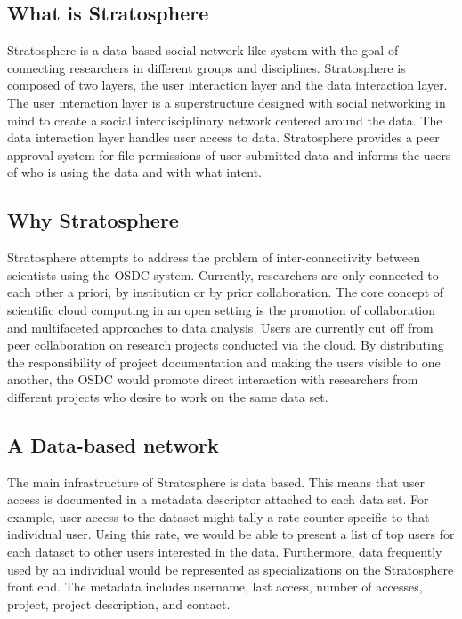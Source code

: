 \tableofcontents
\newpage
\begin{multicols*}{2}
\section{What is Stratosphere}

Stratosphere is a data-based social-network-like system with the goal
of connecting researchers in different groups and disciplines.
Stratosphere is composed of two layers, the user interaction layer and
the data interaction layer.  The user interaction layer is a
superstructure designed with social networking in mind to create a
social interdisciplinary network centered around the data.  The data
interaction layer handles user access to data. Stratosphere provides a
peer approval system for file permissions of user submitted data and
informs the users of who is using the data and with what intent.

\subsection{Why Stratosphere}

Stratosphere attempts to address the problem of inter-connectivity
between scientists using the OSDC system.  Currently, researchers are
only connected to each other a priori, by institution or by prior
collaboration.  The core concept of scientific cloud computing in an
open setting is the promotion of collaboration and multifaceted
approaches to data analysis.  Users are currently cut off from peer
collaboration on research projects conducted via the cloud. By
distributing the responsibility of project documentation and making
the users visible to one another, the OSDC would promote direct
interaction with researchers from different projects who desire to
work on the same data set.

\subsection{A Data-based network}

The main infrastructure of Stratosphere is data based.  This means
that user access is documented in a metadata descriptor attached to
each data set. For example, user access to the dataset might tally a
rate counter specific to that individual user.  Using this rate, we
would be able to present a list of top users for each dataset to other
users interested in the data. Furthermore, data frequently used by an
individual would be represented as specializations on the Stratosphere
front end. The metadata includes username, last access, number of
accesses, project, project description, and contact.



\end{multicols*}
